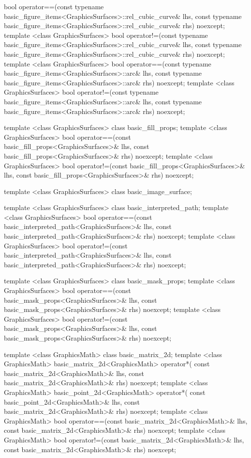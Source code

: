 \begin{codeblock}
{{    bool operator==(const typename 
      basic_figure_items<GraphicsSurfaces>::rel_cubic_curve& lhs,
      const typename basic_figure_items<GraphicsSurfaces>::rel_cubic_curve& 
      rhs) noexcept;
    template <class GraphicsSurfaces>
    bool operator!=(const typename 
      basic_figure_items<GraphicsSurfaces>::rel_cubic_curve& lhs,
      const typename basic_figure_items<GraphicsSurfaces>::rel_cubic_curve& 
      rhs) noexcept;
    template <class GraphicsSurfaces>
    bool operator==(const typename basic_figure_items<GraphicsSurfaces>::arc& 
      lhs, const typename basic_figure_items<GraphicsSurfaces>::arc& rhs) 
      noexcept;
    template <class GraphicsSurfaces>
    bool operator!=(const typename basic_figure_items<GraphicsSurfaces>::arc& 
      lhs, const typename basic_figure_items<GraphicsSurfaces>::arc& rhs) 
      noexcept;
    
    template <class GraphicsSurfaces>
    class basic_fill_props;
    template <class GraphicsSurfaces>
    bool operator==(const basic_fill_props<GraphicsSurfaces>& lhs,
      const basic_fill_props<GraphicsSurfaces>& rhs) noexcept;
    template <class GraphicsSurfaces>
    bool operator!=(const basic_fill_props<GraphicsSurfaces>& lhs,
      const basic_fill_props<GraphicsSurfaces>& rhs) noexcept;
    
    template <class GraphicsSurfaces>
    class basic_image_surface;
    
    template <class GraphicsSurfaces>
    class basic_interpreted_path;
    template <class GraphicsSurfaces>
    bool operator==(const basic_interpreted_path<GraphicsSurfaces>& lhs,
      const basic_interpreted_path<GraphicsSurfaces>& rhs) noexcept;
    template <class GraphicsSurfaces>
    bool operator!=(const basic_interpreted_path<GraphicsSurfaces>& lhs,
      const basic_interpreted_path<GraphicsSurfaces>& rhs) noexcept;
    
    
    template <class GraphicsSurfaces>
    class basic_mask_props;
    template <class GraphicsSurfaces>
    bool operator==(const basic_mask_props<GraphicsSurfaces>& lhs,
      const basic_mask_props<GraphicsSurfaces>& rhs) noexcept;
    template <class GraphicsSurfaces>
    bool operator!=(const basic_mask_props<GraphicsSurfaces>& lhs,
      const basic_mask_props<GraphicsSurfaces>& rhs) noexcept;
    
    template <class GraphicsMath>
    class basic_matrix_2d;
    template <class GraphicsMath>
    basic_matrix_2d<GraphicsMath> operator*(
      const basic_matrix_2d<GraphicsMath>& lhs,
      const basic_matrix_2d<GraphicsMath>& rhs) noexcept;
    template <class GraphicsMath>
    basic_point_2d<GraphicsMath> operator*(
      const basic_point_2d<GraphicsMath>& lhs,
      const basic_matrix_2d<GraphicsMath>& rhs) noexcept;
    template <class GraphicsMath>
    bool operator==(const basic_matrix_2d<GraphicsMath>& lhs,
      const basic_matrix_2d<GraphicsMath>& rhs) noexcept;
    template <class GraphicsMath>
    bool operator!=(const basic_matrix_2d<GraphicsMath>& lhs,
      const basic_matrix_2d<GraphicsMath>& rhs) noexcept;
  
}}
\end{codeblock}
